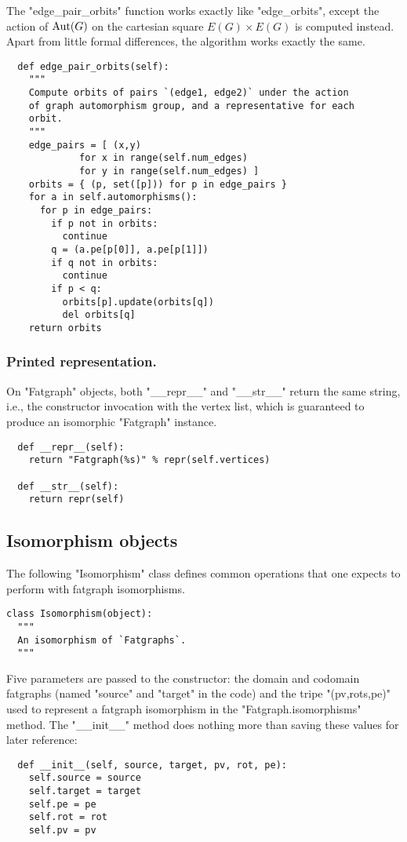 The "edge_pair_orbits" function works exactly like "edge_orbits",
except the action of $\operatorname{Aut}(G)$ on the cartesian square $E(G) \times
E(G)$ is computed instead.  Apart from little formal differences, the
algorithm works exactly the same.
\begin{lstlisting}
  def edge_pair_orbits(self):
    """
    Compute orbits of pairs `(edge1, edge2)` under the action
    of graph automorphism group, and a representative for each
    orbit.
    """
    edge_pairs = [ (x,y) 
             for x in range(self.num_edges)
             for y in range(self.num_edges) ]
    orbits = { (p, set([p])) for p in edge_pairs }
    for a in self.automorphisms():
      for p in edge_pairs:
        if p not in orbits:
          continue
        q = (a.pe[p[0]], a.pe[p[1]])
        if q not in orbits:
          continue
        if p < q:
          orbits[p].update(orbits[q])
          del orbits[q]
    return orbits

\end{lstlisting}


\subsubsection{Printed representation.}
On "Fatgraph" objects, both "__repr__" and "__str__" return the
same string, i.e., the constructor invocation with the vertex list,
which is guaranteed to produce an isomorphic "Fatgraph" instance.
\begin{lstlisting}
  def __repr__(self):
    return "Fatgraph(%s)" % repr(self.vertices)
  
  def __str__(self):
    return repr(self)

\end{lstlisting}


\subsection{Isomorphism objects}
\label{sec:iso}

The following "Isomorphism" class defines common operations that one
expects to perform with fatgraph isomorphisms.
\begin{lstlisting}
class Isomorphism(object):
  """
  An isomorphism of `Fatgraphs`.
  """
\end{lstlisting}
Five parameters are passed to the constructor: the domain
and codomain fatgraphs (named "source" and "target" in the code) and
the tripe "(pv,rots,pe)" used to represent a fatgraph isomorphism in
the "Fatgraph.isomorphisms" method.  The "__init__" method does
nothing more than saving these values for later reference:
\begin{lstlisting}
  def __init__(self, source, target, pv, rot, pe):
    self.source = source
    self.target = target
    self.pe = pe
    self.rot = rot
    self.pv = pv

\end{lstlisting}


